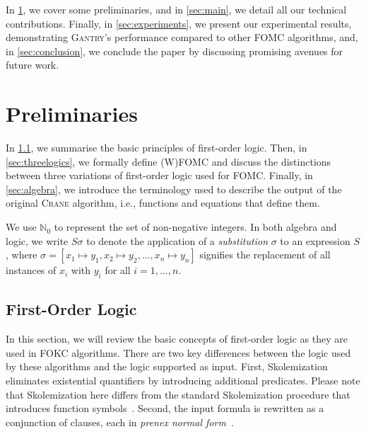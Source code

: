 \documentclass[letterpaper]{article} %
\theoremstyle{remark}
\theoremstyle{definition}
\newcommand{\Cranetwo}{\textsc{Gantry}}
\begin{document}
In \cref{sec:preliminaries}, we cover some preliminaries, and in
\cref{sec:main}, we detail all our technical contributions. Finally, in
\cref{sec:experiments}, we present our experimental results, demonstrating
\Cranetwo{}'s performance compared to other FOMC algorithms, and, in
\cref{sec:conclusion}, we conclude the paper by discussing promising avenues for
future work.

\section{Preliminaries}\label{sec:preliminaries}

In \cref{sec:logic}, we summarise the basic principles of first-order logic.
Then, in \cref{sec:threelogics}, we formally define (W)FOMC and discuss the
distinctions between three variations of first-order logic used for FOMC.\@
Finally, in \cref{sec:algebra}, we introduce the terminology used to describe
the output of the original \textsc{Crane} algorithm, i.e., functions and
equations that define them.

We use $\mathbb{N}_{0}$ to represent the set of non-negative integers. In both
algebra and logic, we write $S\sigma$ to denote the application of a
\emph{substitution} $\sigma$ to an expression $S$, where
$\sigma = [x_{1} \mapsto y_{1}, x_{2} \mapsto y_{2}, \dots, x_{n} \mapsto y_{n}]$
signifies the replacement of all instances of $x_{i}$ with $y_{i}$ for all
$i = 1, \dots, n$.

\subsection{First-Order Logic}\label{sec:logic}

In this section, we will review the basic concepts of first-order logic as they
are used in FOKC algorithms. There are two key differences between the logic
used by these algorithms and the logic supported as input. First,
Skolemization~\cite{DBLP:conf/kr/BroeckMD14} eliminates existential quantifiers
by introducing additional predicates. Please note that Skolemization here
differs from the standard Skolemization procedure that introduces function
symbols~\cite{DBLP:books/daglib/0030198}. Second, the input formula is rewritten
as a conjunction of clauses, each in \emph{prenex normal
  form}~\cite{hinman2018fundamentals}.
\end{document}
